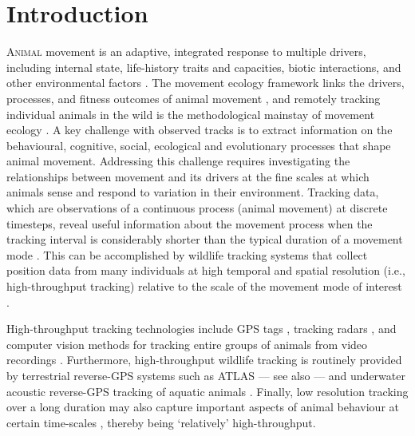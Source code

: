 \newpage

\section*{Introduction}

\lettrine{A}{nimal} movement is an adaptive, integrated response to multiple drivers, including internal state, life-history traits and capacities, biotic interactions, and other environmental factors \citep{nathan2008a, holyoak2008}.
The movement ecology framework links the drivers, processes, and fitness outcomes of animal movement \citep{nathan2008a}, and remotely tracking individual animals in the wild is the methodological mainstay of movement ecology \citep{wikelski2007,nathan2008a,hussey2015,kays2015}.
A key challenge with observed tracks is to extract information on the behavioural, cognitive, social, ecological and evolutionary processes that shape animal movement.
Addressing this challenge requires investigating the relationships between movement and its drivers at the fine scales at which animals sense and respond to variation in their environment. 
Tracking data, which are observations of a continuous process (animal movement) at discrete timesteps, reveal useful information about the movement process when the tracking interval is considerably shorter than the typical duration of a movement mode \citep{nathan2008a, noonan2019, getz2008}.
This can be accomplished by wildlife tracking systems that collect position data from many individuals at high temporal and spatial resolution (i.e., high-throughput tracking) relative to the scale of the movement mode of interest \citep{getz2008}.

High-throughput tracking technologies include GPS tags \citep{strandburg-peshkin2015, papageorgiou2019, harel2016, klarevas-irby2021}, tracking radars \citep{horvitz2014}, and computer vision methods for tracking entire groups of animals from video recordings \citep{rathore2020, perez-escudero2014}. 
Furthermore, high-throughput wildlife tracking is routinely provided by terrestrial reverse-GPS systems such as ATLAS \citep[Advanced Tracking and Localization of Animals in real-life Systems:][]{toledo2014, weiser2016, toledo2016,toledo2020} --- see also \citep{maccurdy2009, maccurdy2019} --- and underwater acoustic reverse-GPS tracking of aquatic animals \citep{baktoft2019, baktoft2017, jung2015, aspillaga2021, aspillaga2021a}.
Finally, low resolution tracking over a long duration may also capture important aspects of animal behaviour at certain time-scales \citep[e.g. migration, long-range dispersal;][]{getz2008}, thereby being `relatively' high-throughput.

